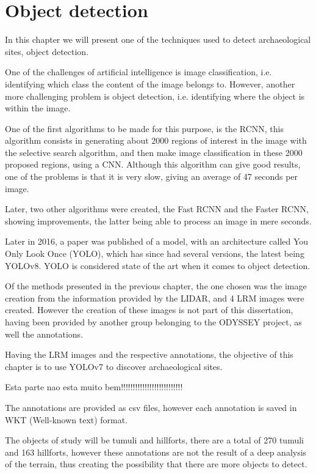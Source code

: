 

\chapter{Object detection}

\begin{introduction}
In this chapter we will present one of the techniques used to detect archaeological sites, object detection.
\end{introduction}

One of the challenges of artificial intelligence is image classification, i.e. identifying which class the content of the image belongs to. However, another more challenging problem is object detection, i.e. identifying where the object is within the image.

One of the first algorithms to be made for this purpose, is the RCNN, this algorithm consists in generating about 2000 regions of interest in the image with the selective search algorithm, and then make image classification in these 2000 proposed regions, using a CNN. Although this algorithm can give good results, one of the problems is that it is very slow, giving an average of 47 seconds per image. 

Later, two other algorithms were created, the Fast RCNN and the Faster RCNN, showing improvements, the latter being able to process an image in mere seconds.

Later in 2016, a paper was published of a model, with an architecture called You Only Look Once (YOLO), which has since had several versions, the latest being YOLOv8.
YOLO is considered state of the art when it comes to object detection.

Of the methods presented in the previous chapter, the one chosen was the image creation from the information provided by the LIDAR, and 4 LRM images were created. However the creation of these images is not part of this dissertation, having been provided by another group belonging to the ODYSSEY project, as well the annotations.

Having the LRM images and the respective annotations, the objective of this chapter is to use YOLOv7 to discover archaeological sites.

Esta parte nao esta muito bem!!!!!!!!!!!!!!!!!!!!!!!!!!

The annotations are provided as csv files, however each annotation is saved in WKT (Well-known text) format.

The objects of study will be tumuli and hillforts, there are a total of 270 tumuli and 163 hillforts, however these annotations are not the result of a deep analysis of the terrain, thus creating the possibility that there are more objects
to detect.

